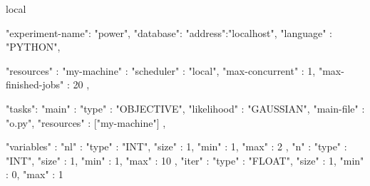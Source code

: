 local

{

    "experiment-name": "power",
    "database": {"address":"localhost"},
    "language"   : "PYTHON",
    
    "resources" : {
	"my-machine" : {
	    "scheduler"         : "local",
	    "max-concurrent"    : 1,
	    "max-finished-jobs" : 20
	}
    },

    "tasks": {
	"main" : {
	    "type"       : "OBJECTIVE",
	    "likelihood" : "GAUSSIAN",
	    "main-file"  : "o.py",
	    "resources"  : ["my-machine"]
	}
    },
    
    "variables" : {
	"nl" : {
	    "type" : "INT",
	    "size" : 1,
	    "min"  : 1,
	    "max"  : 2
	},
	"n" : {
	    "type" : "INT",
	    "size" : 1,
	    "min"  : 1,
	    "max"  : 10
	},
	"iter" : {
	    "type" : "FLOAT",
	    "size" : 1,
	    "min"  : 0,
	    "max"  : 1
	}
    }
}








